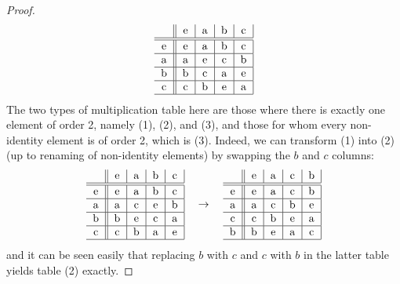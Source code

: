 \documentclass{article}
\theoremstyle{definition}
\begin{document}
\begin{proof}
\begin{align*}
\begin{tabular}{ c || c | c | c | c | }
			                                                     & e & a & b & c \\ \hline\hline
			                                                   e & e & a & b & c \\ \hline
			                                                   a & a & e & c & b \\ \hline
			                                                   b & b & c & a & e \\ \hline
			                                                   c & c & b & e & a \\ \hline
		                                                   \end{tabular}
	\end{align*}
	The two types of multiplication table here are those where there is exactly one element of order 2, namely (1), (2), and (3), and those for whom every non-identity element is of order 2, which is (3).
	Indeed, we can transform (1) into (2) (up to renaming of non-identity elements) by swapping the $b$ and $c$ columns: \begin{equation*}
		\begin{tabular}{ c || c | c | c | c | }
			  & e & a & b & c \\ \hline\hline
			e & e & a & b & c \\ \hline
			a & a & c & e & b \\ \hline
			b & b & e & c & a \\ \hline
			c & c & b & a & e \\ \hline
		\end{tabular}
		\hspace{1em} \to \hspace{1em}
		\begin{tabular}{ c || c | c | c | c | }
			  & e & a & c & b \\ \hline\hline
			e & e & a & c & b \\ \hline
			a & a & c & b & e \\ \hline
			c & c & b & e & a \\ \hline
			b & b & e & a & c \\ \hline
		\end{tabular}
	\end{equation*}
	and it can be seen easily that replacing $b$ with $c$ and $c$ with $b$ in the latter table yields table (2) exactly.


\end{proof}
\end{document}
